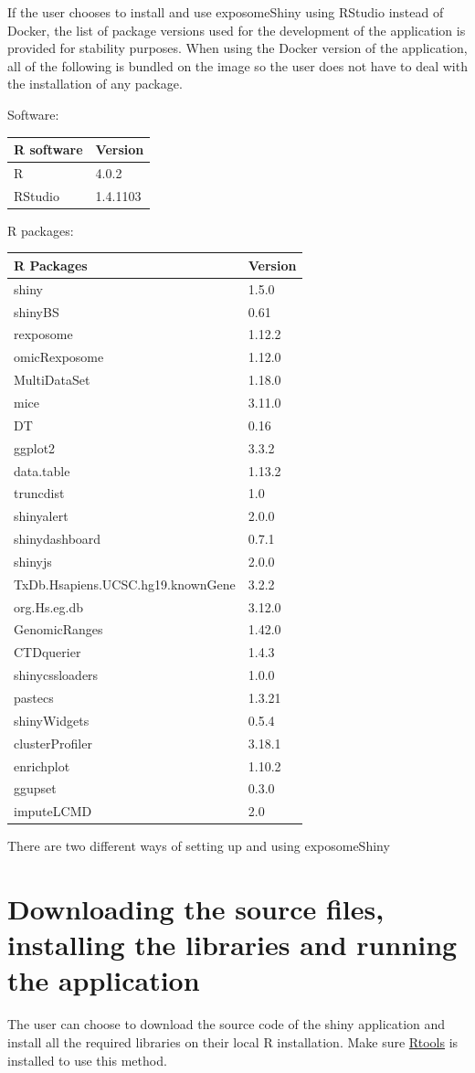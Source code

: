 \documentclass[
]{book}
\begin{document}
If the user chooses to install and use exposomeShiny using RStudio instead of Docker, the list of package versions used for the development of the application is provided for stability purposes. When using the Docker version of the application, all of the following is bundled on the image so the user does not have to deal with the installation of any package.

Software:

\begin{longtable}[]{@{}ll@{}}
\toprule
R software & Version\tabularnewline
\midrule
\endhead
R & 4.0.2\tabularnewline
RStudio & 1.4.1103\tabularnewline
\bottomrule
\end{longtable}

R packages:

\begin{longtable}[]{@{}ll@{}}
\toprule
R Packages & Version\tabularnewline
\midrule
\endhead
shiny & 1.5.0\tabularnewline
shinyBS & 0.61\tabularnewline
rexposome & 1.12.2\tabularnewline
omicRexposome & 1.12.0\tabularnewline
MultiDataSet & 1.18.0\tabularnewline
mice & 3.11.0\tabularnewline
DT & 0.16\tabularnewline
ggplot2 & 3.3.2\tabularnewline
data.table & 1.13.2\tabularnewline
truncdist & 1.0\tabularnewline
shinyalert & 2.0.0\tabularnewline
shinydashboard & 0.7.1\tabularnewline
shinyjs & 2.0.0\tabularnewline
TxDb.Hsapiens.UCSC.hg19.knownGene & 3.2.2\tabularnewline
org.Hs.eg.db & 3.12.0\tabularnewline
GenomicRanges & 1.42.0\tabularnewline
CTDquerier & 1.4.3\tabularnewline
shinycssloaders & 1.0.0\tabularnewline
pastecs & 1.3.21\tabularnewline
shinyWidgets & 0.5.4\tabularnewline
clusterProfiler & 3.18.1\tabularnewline
enrichplot & 1.10.2\tabularnewline
ggupset & 0.3.0\tabularnewline
imputeLCMD & 2.0\tabularnewline
\bottomrule
\end{longtable}

There are two different ways of setting up and using exposomeShiny

\hypertarget{downloading-the-source-files-installing-the-libraries-and-running-the-application}{%
\section{Downloading the source files, installing the libraries and running the application}\label{downloading-the-source-files-installing-the-libraries-and-running-the-application}}

The user can choose to download the source code of the shiny application and install all the required libraries on their local R installation. Make sure \href{https://cran.r-project.org/bin/windows/Rtools/history.html}{Rtools} is installed to use this method.
\end{document}
